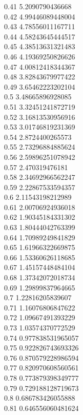 {0.41	5.2090790436668\\
0.42	4.99446089448004\\
0.43	4.78556011167711\\
0.44	4.58243645444517\\
0.45	4.38513631321483\\
0.46	4.19369250826626\\
0.47	4.00812418344367\\
0.48	3.82843679977422\\
0.49	3.65462223202104\\
0.5	3.48665896928085\\
0.51	3.32451241872719\\
0.52	3.16813530956916\\
0.53	3.01746819231369\\
0.54	2.8724400265573\\
0.55	2.73296884885624\\
0.56	2.59896251078942\\
0.57	2.470319476181\\
0.58	2.34692966562247\\
0.59	2.22867533594357\\
0.6	2.11543198212989\\
0.61	2.00706924936018\\
0.62	1.90345184331302\\
0.63	1.80444042763399\\
0.64	1.70989249841829\\
0.65	1.61966322669875\\
0.66	1.53360626118685\\
0.67	1.45157448484104\\
0.68	1.37342072018734\\
0.69	1.29899837964665\\
0.7	1.22816205839607\\
0.71	1.16076806847622\\
0.72	1.09667491393229\\
0.73	1.03574370772529\\
0.74	0.977838531965057\\
0.75	0.922826743693326\\
0.76	0.870579228986594\\
0.77	0.820970608560561\\
0.78	0.773879398349777\\
0.79	0.729188128719673\\
0.8	0.686783426055888\\
0.81	0.646556060481624\\
}

